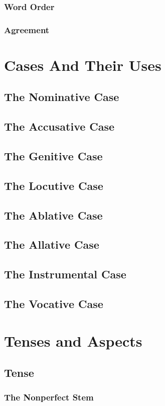 \documentclass[oneside]{book}
\begin{document}
\subsection{Word Order}
\subsection{Agreement}

\chapter{Cases And Their Uses}
\section{The Nominative Case}
\section{The Accusative Case}
\section{The Genitive Case}
\section{The Locutive Case}
\section{The Ablative Case}
\section{The Allative Case}
\section{The Instrumental Case}
\section{The Vocative Case}

\chapter{Tenses and Aspects}
\section{Tense}
\subsection{The Nonperfect Stem}
\end{document}
